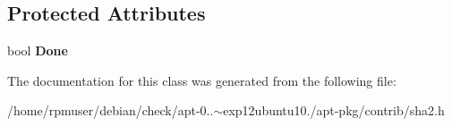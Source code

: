 \subsection*{\-Protected \-Attributes}
\begin{DoxyCompactItemize}
\item 
bool {\bfseries \-Done}\label{classSHA2SummationBase_ac3fdeca3b63101bb46822fca80eacc18}

\end{DoxyCompactItemize}


\-The documentation for this class was generated from the following file\-:\begin{DoxyCompactItemize}
\item 
/home/rpmuser/debian/check/apt-\/0..$\sim$exp12ubuntu10./apt-\/pkg/contrib/sha2.\-h\end{DoxyCompactItemize}
